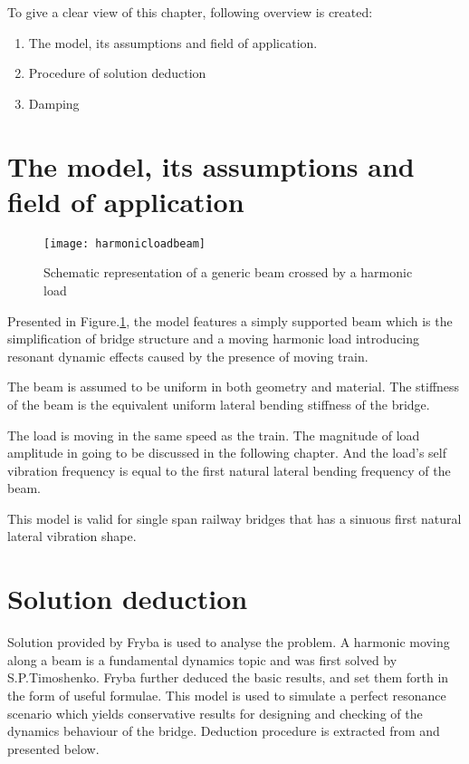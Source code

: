 To give a clear view of this chapter, following overview is created:

\begin{enumerate}
    \item The model, its assumptions and field of application. 
    \item Procedure of solution deduction
    \item Damping
\end{enumerate}

\section{The model, its assumptions and field of application}

\begin{figure}[h]
    \centering
    \texttt{[image: harmonicloadbeam]}
    \caption{Schematic representation of a generic beam crossed by a harmonic load}
    \label{fig:harmonicloadbeam}
\end{figure}

Presented in Figure.\ref{fig:harmonicloadbeam}, the model features a simply supported beam which is the simplification of bridge structure and a moving harmonic load introducing resonant dynamic effects caused by the presence of moving train.

The beam is assumed to be uniform in both geometry and material. The stiffness of the beam is the equivalent uniform lateral bending stiffness of the bridge. 

The load is moving in the same speed as the train. The magnitude of load amplitude in going to be discussed in the following chapter. And the load's self vibration frequency is equal to the first natural lateral bending frequency of the beam.


This model is valid for single span railway bridges that has a sinuous first natural lateral vibration shape.  

\section{Solution deduction}

Solution provided by Fryba\cite{fryba1999vibration} is used to analyse the problem. A harmonic moving along a beam is a fundamental dynamics topic and was first solved by S.P.Timoshenko. Fryba further deduced the basic results, and set them forth in the form of useful formulae. This model is used to simulate a perfect resonance scenario which yields conservative results for designing and checking of the dynamics behaviour of the bridge. Deduction procedure is extracted from \cite[Section II.2.1]{fryba1999vibration} and presented below.

